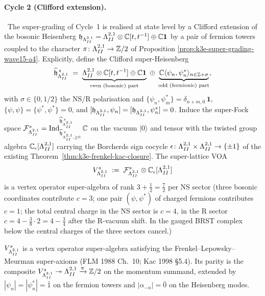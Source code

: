 \paragraph{Cycle 2 (Clifford extension).}
\ClaimStatusProvedHere\
The super-grading of Cycle~1 is realised at state level by a
Clifford extension of the bosonic Heisenberg
$\mathfrak{h}_{\Lambda^{2,1}_{II}} = \Lambda^{2,1}_{II} \otimes \mathbb{C}[t, t^{-1}] \oplus
\mathbb{C} \mathbf{1}$ by a pair of fermion towers coupled to the
character $\pi\colon \Lambda^{2,1}_{II} \to \mathbb{Z}/2$ of Proposition
\ref{prop:k3e-super-grading-wave15-a4}. Explicitly, define the
Clifford super-Heisenberg
\[
  \widehat\fh^{\,s}_{\Lamii}
  \;=\;
  \underbrace{\Lamii \otimes \CC[t, t^{-1}] \oplus \CC \mathbf{1}}_{%
    \text{even (bosonic) part}}
  \;\oplus\;
  \underbrace{\CC\langle \psi_n, \psi_n^*\rangle_{n \in \ZZ + \sigma}}_{%
    \text{odd (fermionic) part}},
\]
with $\sigma \in \{0, 1/2\}$ the NS/R polarisation and
$\{\psi_n, \psi_m^*\} = \delta_{n + m, 0}\,\mathbf{1}$, $\{\psi, \psi\}
= \{\psi^*, \psi^*\} = 0$, and
$[\mathfrak{h}_{\Lambda^{2,1}_{II}}, \psi_n] = [\mathfrak{h}_{\Lambda^{2,1}_{II}}, \psi_n^*] = 0$.
Induce the super-Fock space
$\Fock^s_{\Lamii} = \mathrm{Ind}^{\widehat\fh^{\,s}_{\Lamii}}_{%
\widehat\fh^{\,s}_{\Lamii,\geq 0}}\, \CC$ on the vacuum
$|0\rangle$ and tensor with the twisted group algebra
$\mathbb{C}_\epsilon[\Lambda^{2,1}_{II}]$ carrying the Borcherds sign cocycle
$\epsilon\colon \Lambda^{2,1}_{II} \times \Lambda^{2,1}_{II} \to \{\pm 1\}$ of the
existing Theorem~\ref{thm:k3e-frenkel-kac-closure}. The
super-lattice VOA
\[
  V^s_{\Lambda^{2,1}_{II}}
  \;:=\;
  \mathcal{F}^s_{\Lambda^{2,1}_{II}} \otimes \mathbb{C}_\epsilon[\Lambda^{2,1}_{II}]
\]
is a vertex operator super-algebra of rank $3 + \frac{1}{2}
= \frac{7}{2}$ per NS sector
(three bosonic coordinates contribute $c = 3$;
one pair $(\psi, \psi^*)$ of charged fermions contributes $c = 1$;
the total central charge in the NS sector is $c = 4$, in the
R sector $c = 4 - \frac{3}{8}\cdot 2 = 4 - \frac{3}{4}$ after the
R-vacuum shift. In the gauged BRST complex below the central charges
of the three sectors cancel.)

\begin{theorem}
\label{thm:wave15-a4-clifford-is-super-VOA}
\ClaimStatusProvedHere
$V^s_{\Lambda^{2,1}_{II}}$ is a vertex operator super-algebra satisfying
the Frenkel--Lepowsky--Meurman super-axioms (FLM 1988 Ch.~10;
Kac 1998 \S5.4). Its parity is the composite
$V^s_{\Lambda^{2,1}_{II}} \twoheadrightarrow \Lambda^{2,1}_{II} \xrightarrow{\pi} \mathbb{Z}/2$ on
the momentum summand, extended by $|{\psi_n}| = |{\psi_n^*}| = \bar 1$
on the fermion towers and $|{\alpha_{-n}}| = \bar 0$ on the Heisenberg
modes.
\end{theorem}


